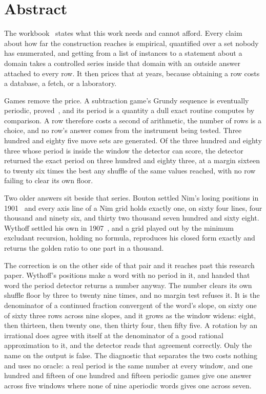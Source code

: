 \chapter*{Abstract}

The workbook~\cite{src:Quigg-orior-workbook} states what this work needs and cannot afford. Every claim about how far the
construction reaches is empirical, quantified over a set nobody has enumerated, and getting from a
list of instances to a statement about a domain takes a controlled series inside that domain with an
outside answer attached to every row. It then prices that at years, because obtaining a row costs a
database, a fetch, or a laboratory.

Games remove the price. A subtraction game's Grundy sequence is eventually periodic, proved~\cite{src:Berlekamp-Conway-and-Guy-1982}, and its
period is a quantity a dull exact routine computes by comparison. A row therefore costs a second of
arithmetic, the number of rows is a choice, and no row's answer comes from the instrument being
tested. Three hundred and eighty five move sets are generated. Of the three hundred and eighty
three whose period is inside the window the detector can score, the detector returned the exact
period on three hundred and eighty three, at a margin sixteen to twenty six times the best any
shuffle of the same values reached, with no row failing to clear its own floor.

Two older answers sit beside that series. Bouton settled Nim's losing positions in 1901~\cite{src:Bouton-1901} and every
axis line of a Nim grid holds exactly one, on sixty four lines, four thousand and ninety six, and
thirty two thousand seven hundred and sixty eight. Wythoff settled his own in 1907~\cite{src:Wythoff-1907}, and a grid
played out by the minimum excludant recursion, holding no formula, reproduces his closed form
exactly and returns the golden ratio to one part in a thousand.

The correction is on the other side of that pair and it reaches past this research paper. Wythoff's positions
make a word with no period in it, and handed that word the period detector returns a number anyway.
The number clears its own shuffle floor by three to twenty nine times, and no margin test refuses it.
It is the denominator of a continued fraction convergent of the word's slope, on sixty one of sixty
three rows across nine slopes, and it grows as the window widens: eight, then thirteen, then twenty
one, then thirty four, then fifty five. A rotation by an irrational does agree with itself at the
denominator of a good rational approximation to it, and the detector reads that agreement correctly.
Only the name on the output is false. The diagnostic that separates the two costs nothing and uses
no oracle: a real period is the same number at every window, and one hundred and fifteen of one
hundred and fifteen periodic games give one answer across five windows where none of nine aperiodic
words gives one across seven.

